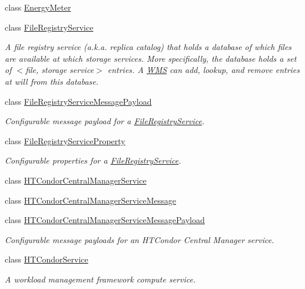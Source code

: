 \begin{DoxyCompactItemize}
class \hyperlink{classwrench_1_1_energy_meter}{Energy\+Meter}
\item 
class \hyperlink{classwrench_1_1_file_registry_service}{File\+Registry\+Service}
\begin{DoxyCompactList}\small\item\em A file registry service (a.\+k.\+a. replica catalog) that holds a database of which files are available at which storage services. More specifically, the database holds a set of $<$file, storage service$>$ entries. A \hyperlink{classwrench_1_1_w_m_s}{W\+MS} can add, lookup, and remove entries at will from this database. \end{DoxyCompactList}\item 
class \hyperlink{classwrench_1_1_file_registry_service_message_payload}{File\+Registry\+Service\+Message\+Payload}
\begin{DoxyCompactList}\small\item\em Configurable message payload for a \hyperlink{classwrench_1_1_file_registry_service}{File\+Registry\+Service}. \end{DoxyCompactList}\item 
class \hyperlink{classwrench_1_1_file_registry_service_property}{File\+Registry\+Service\+Property}
\begin{DoxyCompactList}\small\item\em Configurable properties for a \hyperlink{classwrench_1_1_file_registry_service}{File\+Registry\+Service}. \end{DoxyCompactList}\item 
class \hyperlink{classwrench_1_1_h_t_condor_central_manager_service}{H\+T\+Condor\+Central\+Manager\+Service}
\item 
class \hyperlink{classwrench_1_1_h_t_condor_central_manager_service_message}{H\+T\+Condor\+Central\+Manager\+Service\+Message}
\item 
class \hyperlink{classwrench_1_1_h_t_condor_central_manager_service_message_payload}{H\+T\+Condor\+Central\+Manager\+Service\+Message\+Payload}
\begin{DoxyCompactList}\small\item\em Configurable message payloads for an H\+T\+Condor Central Manager service. \end{DoxyCompactList}\item 
class \hyperlink{classwrench_1_1_h_t_condor_service}{H\+T\+Condor\+Service}
\begin{DoxyCompactList}\small\item\em A workload management framework compute service. \end{DoxyCompactList}\item 

\end{DoxyCompactItemize}
